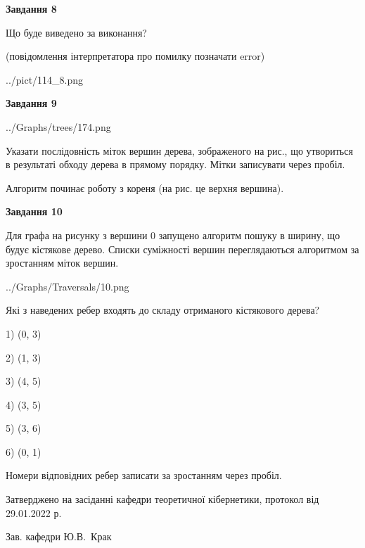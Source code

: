 \documentclass[12pt, ukrainian]{article}
\begin{document}
{\begin {large}
{\begin {center}\textbf{Завдання 8}\end {center}}\par
Що буде виведено за виконання?\par
 (повідомлення інтерпретатора про помилку позначати error)\par
\begin{center}
	{../pict/114_8.png}
\end{center}
\newpage

{\begin {center}\textbf{Завдання 9}\end {center}}\par

\begin{center}
	{../Graphs/trees/174.png}
\end{center}
Указати послідовність міток вершин дерева, зображеного на рис., що утвориться в результаті обходу дерева в прямому порядку. Мітки записувати через пробіл.\par Алгоритм починає роботу з кореня (на рис. це верхня вершина).\par
\newpage

{\begin {center}\textbf{Завдання 10}\end {center}}\par
Для графа на рисунку з вершини 0 запущено алгоритм пошуку в ширину, що будує кістякове дерево. Списки суміжності вершин переглядаються алгоритмом за зростанням міток вершин.\par
\begin{center}
	{../Graphs/Traversals/10.png}
\end{center}
\par Які з наведених ребер входять до складу отриманого кістякового дерева?\par
1) (0, 3)\par
2) (1, 3)\par
3) (4, 5)\par
4) (3, 5)\par
5) (3, 6)\par
6) (0, 1)\par
{\vskip 15pt} Номери відповідних ребер записати за зростанням через пробіл.\par
\newpage


\end {large}
}
{\smallskip \begin {small} Затверджено на засіданні кафедри теоретичної кібернетики, протокол  від   29.01.2022 р.\par\smallskip\smallskip
{\parbox {6.5 cm}{Зав. кафедри \dotfill Ю.В.~Крак}} \end{small}}
\end{document}
